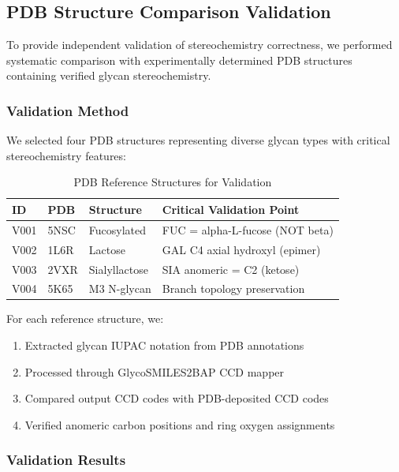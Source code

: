 
\subsection{PDB Structure Comparison Validation}
\label{sec:pdb_validation}

To provide independent validation of stereochemistry correctness, we performed systematic comparison with experimentally determined PDB structures containing verified glycan stereochemistry.

\subsubsection{Validation Method}

We selected four PDB structures representing diverse glycan types with critical stereochemistry features:

\begin{table}[h]
\centering
\caption{PDB Reference Structures for Validation}
\begin{tabular}{lllp{4cm}}
\toprule
ID & PDB & Structure & Critical Validation Point \\
\midrule
V001 & 5NSC & Fucosylated & FUC = alpha-L-fucose (NOT beta) \\
V002 & 1L6R & Lactose & GAL C4 axial hydroxyl (epimer) \\
V003 & 2VXR & Sialyllactose & SIA anomeric = C2 (ketose) \\
V004 & 5K65 & M3 N-glycan & Branch topology preservation \\
\bottomrule
\end{tabular}
\end{table}

For each reference structure, we:
\begin{enumerate}
\item Extracted glycan IUPAC notation from PDB annotations
\item Processed through GlycoSMILES2BAP CCD mapper
\item Compared output CCD codes with PDB-deposited CCD codes
\item Verified anomeric carbon positions and ring oxygen assignments
\end{enumerate}

\subsubsection{Validation Results}

